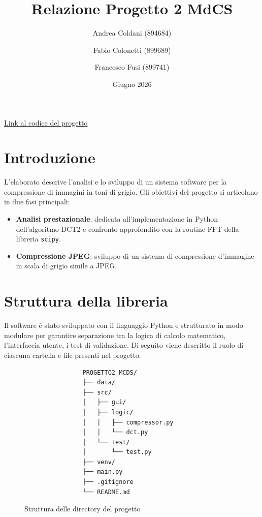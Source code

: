 \documentclass{article}
\title{Relazione Progetto 2 MdCS}
\author{Andrea Coldani (894684) \and Fabio Colonetti (899689) \and Francesco Fusi (899741)}
\date{Giugno 2026}
\begin{document}
	
\maketitle

\begin{center}
\href{https://github.com/ffusi12/Progetto2_MCdS}{Link al codice del progetto}
\end{center}

\section{Introduzione}
L'elaborato descrive l'analisi e lo sviluppo di un sistema software per la compressione di immagini in toni di grigio. 
Gli obiettivi del progetto si articolano in due fasi principali:
\begin{itemize}
	\item \textbf{Analisi prestazionale}: dedicata all'implementazione in Python dell'algoritmo DCT2 e confronto approfondito con 
	la routine FFT della libreria \texttt{scipy}.
	\item \textbf{Compressione JPEG}: sviluppo di un sistema di compressione d'immagine in scala di grigio simile a JPEG.
\end{itemize}

\section{Struttura della libreria}
Il software è stato sviluppato con il linguaggio Python e strutturato in modo modulare per garantire separazione tra la logica 
di calcolo matematico, l'interfaccia utente, i test di validazione. Di seguito viene descritto il ruolo di ciascuna cartella e 
file presenti nel progetto:

	\begin{figure}[H]
		\centering %
		\begin{tcolorbox}[
			colback=gray!10,       %
			colframe=gray!50,      %
			width=0.65\textwidth,  %
			arc=2pt,               %
			boxrule=0.8pt,         %
			halign=left,           %
			before skip=0.5cm,     %
			after skip=0.5cm       %
			]
			\begin{verbatim}
				PROGETTO2_MCDS/
				├── data/
				├── src/
				│   ├── gui/
				│   ├── logic/
				│   │   ├── compressor.py
				│   │   └── dct.py
				│   └── test/
				│       └── test.py
				├── venv/
				├── main.py
				├── .gitignore
				└── README.md
			\end{verbatim}
		\end{tcolorbox}
		\caption{Struttura delle directory del progetto}
	\end{figure}
\end{document}
